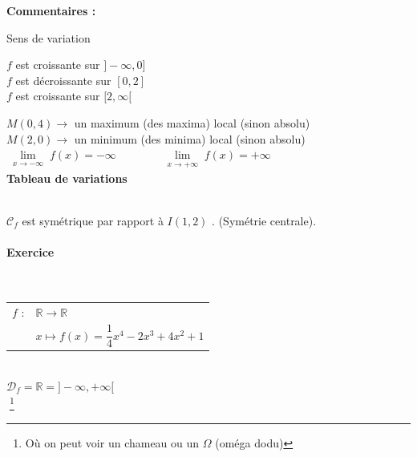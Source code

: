 \textbf{Commentaires :}

 Sens de variation 

$f$ est croissante sur $]- \infty, 0]$ \\
$f$ est décroissante sur $[0, 2]$ \\
$f$ est croissante sur $[2, \infty[$ \\

\smallskip 

$M(0,4) \longrightarrow $ un maximum (des maxima) local (sinon absolu) \\
$M(2,0) \longrightarrow $ un minimum (des minima) local (sinon absolu)\\

$\lim\limits_{\substack{x \to -\infty}} f(x) = -\infty \qquad \qquad \lim\limits_{\substack{x \to +\infty}} f(x) = +\infty $ \\


\textbf{Tableau de variations}\\

\\

$\mathscr{C}_f$ est symétrique par rapport à $I(1,2)$ . (Symétrie centrale). 

\newpage

\paragraph{Exercice }~\\

\begin{tabular}{l@{$\;$ }l}
 $f$ : & $ \mathbb{R} \longrightarrow \mathbb{R}$\\
       & $ x \longmapsto f(x) = \dfrac{1}{4}x^4 -2x^3 +4x^2 +1$ 
\end{tabular}\\

$\mathscr{D}_f = \mathbb{R} = ] -\infty, +\infty [ $ \\

\vspace{1cm}
\hspace*{7.5cm}$\;$\footnote{Où on peut voir un chameau ou un $\Omega$ (oméga dodu)}

